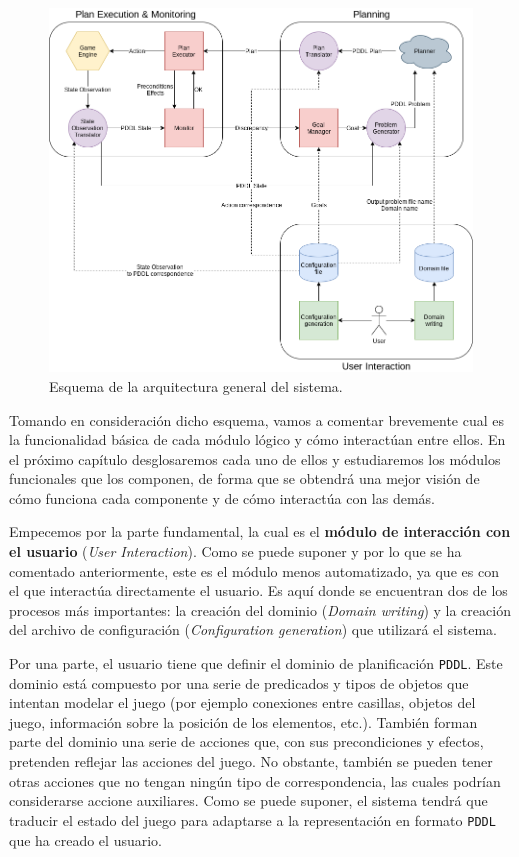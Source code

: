 \begin{figure}[H]
    \centering
    \includegraphics[scale=0.4]{img/CH04/system_arch.png}
    \caption{Esquema de la arquitectura general del sistema.}
    \label{fig:system_arch}
\end{figure}

Tomando en consideración dicho esquema, vamos a comentar brevemente cual es
la funcionalidad básica de cada módulo lógico y cómo interactúan entre ellos.
En el próximo capítulo desglosaremos cada uno de ellos y estudiaremos los módulos
funcionales que los componen, de forma que se obtendrá una mejor visión de cómo
funciona cada componente y de cómo interactúa con las demás.

Empecemos por la parte fundamental, la cual es el \textbf{módulo de interacción con el usuario}
(\textit{User Interaction}). Como se puede suponer y por lo que se ha comentado anteriormente,
este es el módulo menos automatizado, ya que es con el que interactúa directamente el usuario.
Es aquí donde se encuentran dos de los procesos más importantes: la creación del dominio
(\textit{Domain writing}) y la creación del archivo de configuración
(\textit{Configuration generation}) que utilizará el sistema.

Por una parte, el usuario tiene que definir el dominio de planificación \texttt{PDDL}. Este dominio está
compuesto por una serie de predicados y tipos de objetos que intentan modelar el
juego (por ejemplo conexiones entre casillas, objetos del juego, información sobre la
posición de los elementos, etc.). También forman parte del dominio una serie de acciones
que, con sus precondiciones y efectos, pretenden reflejar las acciones del juego. No obstante,
también se pueden tener otras acciones que no tengan ningún tipo de correspondencia, las cuales
podrían considerarse accione auxiliares. Como se puede suponer, el sistema tendrá que traducir
el estado del juego para adaptarse a la representación en formato \texttt{PDDL} que ha
creado el usuario.

